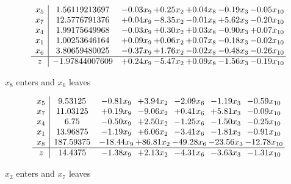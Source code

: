\documentclass[9pt]{article}
\begin{document}
 \[\begin{array}{c| c c@{\hskip 2pt} c@{\hskip 2pt} c@{\hskip 2pt} c@{\hskip 2pt} c@{\hskip 2pt} }
 x_{5}   &  1.56119213697 & -0.03 x_{9} & +  0.25 x_{2} & +  0.04 x_{8} & -0.19 x_{3} & -0.05 x_{10}\\
 x_{7}   &  12.5776791376 & +  0.04 x_{9} & -8.35 x_{2} & -0.01 x_{8} & +  5.62 x_{3} & -0.20 x_{10}\\
 x_{4}   &  1.99175649968 & -0.03 x_{9} & +  0.30 x_{2} & +  0.03 x_{8} & -0.90 x_{3} & +  0.07 x_{10}\\
 x_{1}   &  1.00253646164 & +  0.09 x_{9} & +  0.06 x_{2} & +  0.07 x_{8} & -0.18 x_{3} & -0.02 x_{10}\\
 x_{6}   &  3.80659480025 & -0.37 x_{9} & +  1.76 x_{2} & -0.02 x_{8} & -0.48 x_{3} & -0.26 x_{10}\\
\hline
z    &  -1.97844007609 & +  0.24 x_{9} & -5.47 x_{2} & +  0.09 x_{8} & -1.56 x_{3} & -0.19 x_{10}\\
\end{array}\]


 $ x_{8} $ enters and $ x_{6} $ leaves 

 \[\begin{array}{c| c c@{\hskip 2pt} c@{\hskip 2pt} c@{\hskip 2pt} c@{\hskip 2pt} c@{\hskip 2pt} }
 x_{5}   &  9.53125 & -0.81 x_{9} & +  3.94 x_{2} & -2.09 x_{6} & -1.19 x_{3} & -0.59 x_{10}\\
 x_{7}   &  11.03125 & +  0.19 x_{9} & -9.06 x_{2} & +  0.41 x_{6} & +  5.81 x_{3} & -0.09 x_{10}\\
 x_{4}   &  6.75 & -0.50 x_{9} & +  2.50 x_{2} & -1.25 x_{6} & -1.50 x_{3} & -0.25 x_{10}\\
 x_{1}   &  13.96875 & -1.19 x_{9} & +  6.06 x_{2} & -3.41 x_{6} & -1.81 x_{3} & -0.91 x_{10}\\
 x_{8}   &  187.59375 & -18.44 x_{9} & + 86.81 x_{2} & -49.28 x_{6} & -23.56 x_{3} & -12.78 x_{10}\\
\hline
z    &  14.4375 & -1.38 x_{9} & +  2.13 x_{2} & -4.31 x_{6} & -3.63 x_{3} & -1.31 x_{10}\\
\end{array}\]


 $ x_{2} $ enters and $ x_{7} $ leaves 
\end{document}

